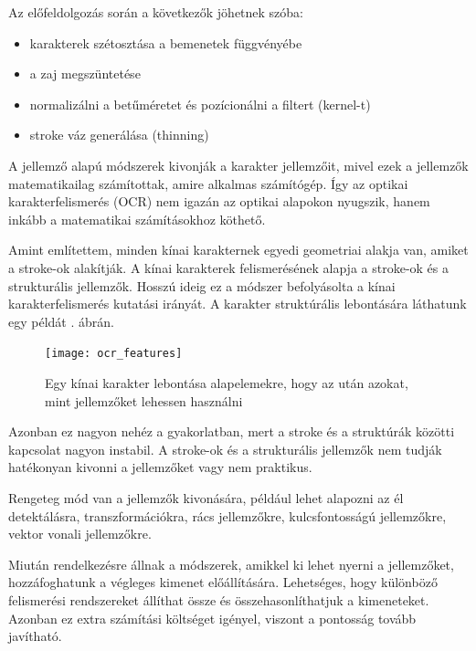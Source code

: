 Az előfeldolgozás során a következők jöhetnek szóba: 
\begin{itemize}
\item karakterek szétosztása a bemenetek függvényébe
\item a zaj megszüntetése
\item normalizálni a betűméretet és pozícionálni a filtert (kernel-t)
\item stroke váz generálása (thinning)
\end{itemize}

A jellemző alapú módszerek kivonják a karakter jellemzőit, mivel ezek a jellemzők matematikailag számítottak, amire alkalmas számítógép. Így az optikai karakterfelismerés (OCR) nem igazán az optikai alapokon nyugszik, hanem inkább a matematikai számításokhoz köthető.

Amint említettem, minden kínai karakternek egyedi geometriai alakja van, amiket a stroke-ok alakítják. A kínai karakterek felismerésének alapja a stroke-ok és a strukturális jellemzők. Hosszú ideig ez a módszer befolyásolta a kínai karakterfelismerés kutatási irányát.
A karakter struktúrális lebontására láthatunk egy példát . ábrán.

\begin{figure}
\centering
\texttt{[image: ocr\_features]}
\caption{Egy kínai karakter lebontása alapelemekre, hogy az után azokat, mint jellemzőket lehessen használni}
\label{fig:ocr_features}
\end{figure}

Azonban ez nagyon nehéz a gyakorlatban, mert a stroke és a struktúrák közötti kapcsolat nagyon instabil. A stroke-ok és a strukturális jellemzők nem tudják hatékonyan kivonni a jellemzőket vagy nem praktikus.

Rengeteg mód van a jellemzők kivonására, például lehet alapozni az él detektálásra, transzformációkra, rács jellemzőkre, kulcsfontosságú jellemzőkre, vektor vonali jellemzőkre.

Miután rendelkezésre állnak a módszerek, amikkel ki lehet nyerni a jellemzőket, hozzáfoghatunk a végleges kimenet előállítására. Lehetséges, hogy különböző felismerési rendszereket állíthat össze és összehasonlíthatjuk a kimeneteket. Azonban ez extra számítási költséget igényel, viszont a pontosság tovább javítható.

